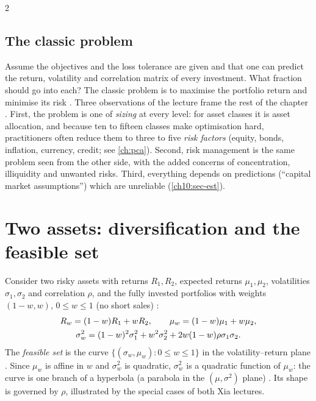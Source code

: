 \begin{paracol}{2}
\subsection{The classic problem}
Assume the objectives and the loss tolerance are given and that one can predict the return, volatility and
correlation matrix of every investment. What fraction should go into each? The classic problem is to maximise the
portfolio return and minimise its risk . Three observations of the lecture frame the rest of
the chapter . First, the problem is one of \emph{sizing} at every level: for asset
classes it is asset allocation, and because ten to fifteen classes make optimisation hard, practitioners often
reduce them to three to five \emph{risk factors} (equity, bonds, inflation, currency, credit; see
\cref{ch:pca}). Second, risk management is the same problem seen from the other side, with the added concerns of
concentration, illiquidity and unwanted risks. Third, everything depends on predictions (``capital market
assumptions'') which are unreliable (\cref{ch10:sec-est}).

\section{Two assets: diversification and the feasible set}\label{ch10:sec-two}

Consider two risky assets with returns $R_1,R_2$, expected returns $\mu_1,\mu_2$, volatilities
$\sigma_1,\sigma_2$ and correlation $\rho$, and the fully invested portfolios with weights $(1-w,w)$, $0\le w\le1$
(no short sales) :
\begin{gather}\label{ch10:eq-two}
  R_w=(1-w)R_1+wR_2,\qquad \mu_w=(1-w)\mu_1+w\mu_2,\notag\\
  \sigma_w^2=(1-w)^2\sigma_1^2+w^2\sigma_2^2+2w(1-w)\rho\sigma_1\sigma_2 .
\end{gather}
The \emph{feasible set} is the curve $\{(\sigma_w,\mu_w):0\le w\le1\}$ in the volatility--return plane
. Since $\mu_w$ is affine in $w$ and $\sigma_w^2$ is quadratic, $\sigma_w^2$ is a quadratic
function of $\mu_w$: the curve is one branch of a hyperbola (a parabola in the $(\mu,\sigma^2)$ plane)
. Its shape is governed by $\rho$, illustrated by the special cases of both Xia lectures.


\end{paracol}
